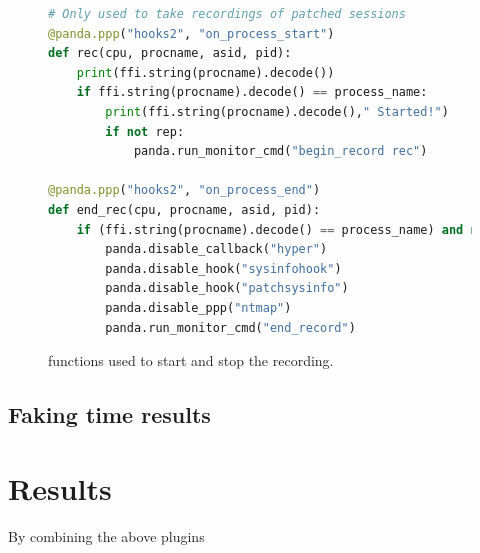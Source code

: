 \begin{figure}[htp]
\centering
\begin{lstlisting}[language=Python] 
# Only used to take recordings of patched sessions
@panda.ppp("hooks2", "on_process_start")
def rec(cpu, procname, asid, pid):
    print(ffi.string(procname).decode())
    if ffi.string(procname).decode() == process_name:
        print(ffi.string(procname).decode()," Started!")
        if not rep:
            panda.run_monitor_cmd("begin_record rec")

@panda.ppp("hooks2", "on_process_end")
def end_rec(cpu, procname, asid, pid):
    if (ffi.string(procname).decode() == process_name) and not rep:
        panda.disable_callback("hyper")
        panda.disable_hook("sysinfohook")
        panda.disable_hook("patchsysinfo")
        panda.disable_ppp("ntmap")
        panda.run_monitor_cmd("end_record")
\end{lstlisting}
\caption{functions used to start and stop the recording.}
\label{fig:startstop}
\end{figure}


\subsection{Faking time results}




\section{Results}

By combining the above plugins 